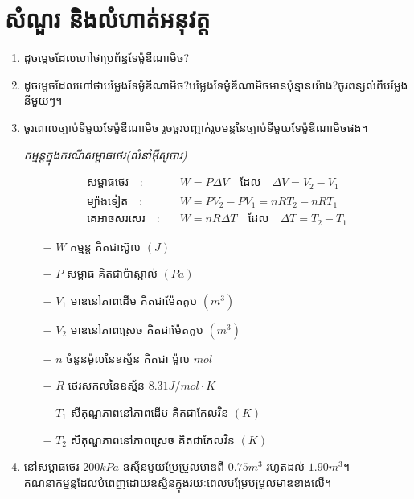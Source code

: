 \section{សំណួរ និងលំហាត់អនុវត្ត}
\begin{enumerate}[m]
		\item ដូចម្តេចដែលហៅថាប្រព័ន្ធទែម៉ូឌីណាមិច?
		\item ដូចម្តេចដែលហៅថាបម្លែងទែម៉ូឌីណាមិច?បម្លែងទែម៉ូឌីណាមិចមានប៉ុន្មានយ៉ាង?ចូរពន្យល់ពីបម្លែងនីមួយៗ។
		\item ចូរពោលច្បាប់ទីមួយទែម៉ូឌីណាមិច រួចចូរបញ្ជាក់រូបមន្តនៃច្បាប់ទីមួយទែម៉ូឌីណាមិចផង។
		\begin{formula}
			\begin{center}
				\emph{\kml កម្មន្តក្នុងករណីសម្ពាធថេរ(លំនាំអុីសូបារ)}
			\end{center}
			\begin{align*}
				\text{សម្ពាធថេរ}\quad :&\quad W=P\Delta V \quad\text{ដែល}\quad \Delta V=V_2-V_1\\
				\text{ម្យ៉ាងទៀត}\quad :&\quad W=PV_{2}-PV_{1}=nRT_{2}-nRT_{1}\\
				\text{គេអាចសរសេរ}\quad :&\quad W=nR\Delta T\quad \text{ដែល}\quad \Delta T= T_2-T_1 
			\end{align*}
			\begin{multicols}{2}
				\begin{itemize}
					\item [$-$] $W$ កម្មន្ត គិតជាស៊ូល $\left(J\right)$
					\item [$-$] $P$ សម្ពាធ គិតជាប៉ាស្កាល់ $\left(Pa\right)$
					\item [$-$] $V_{1}$ មាឌនៅភាពដើម គិតជាម៉ែតគូប $\left(m^3\right)$
					\item [$-$] $V_{2}$ មាឌនៅភាពស្រេច គិតជាម៉ែតគូប $\left(m^3\right)$
					\item [$-$] $n$ ចំនួនម៉ូលនៃឧស្ម័ន គិតជា ម៉ូល $mol$
					\item [$-$] $R$ ថេរសកលនៃឧស្ម័ន $8.31J/mol\cdot K$
					\item [$-$] $T_1$ សីតុណ្ហភាពនៅភាពដើម គិតជាកែលវិន $\left(K\right)$
					\item [$-$] $T_2$ សីតុណ្ហភាពនៅភាពស្រេច គិតជាកែលវិន $\left(K\right)$
				\end{itemize}
			\end{multicols}
		\end{formula}
		\item នៅសម្ពាធថេរ $200kPa$ ឧស្ម័នមួយប្រែប្រួលមាឌពី $0.75m^3$ រហូតដល់ $1.90m^3$។\\
		គណនាកម្មន្តដែលបំពេញដោយឧស្ម័នក្នុងរយៈពេលបម្រែបម្រួលមាឌខាងលើ។

\end{enumerate}
